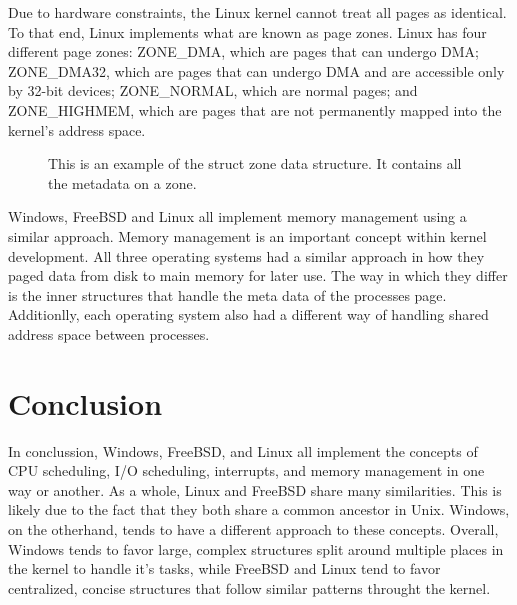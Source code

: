 \documentclass[journal,letterpaper,draftclsnofoot,onecolumn,10pt]{IEEEtran}
\begin{document}
Due to hardware constraints, the Linux kernel cannot treat all pages as identical. To that end, Linux implements what are known as page zones. Linux has four different page zones: ZONE\_DMA, which are pages that can undergo DMA; ZONE\_DMA32, which are pages that can undergo DMA and are accessible only by 32-bit devices; ZONE\_NORMAL, which are normal pages; and ZONE\_HIGHMEM, which are pages that are not permanently mapped into the kernel's address space. \cite{l05}

\begin{figure}[H]
   
   \caption{This is an example of the struct zone data structure. It contains all the metadata on a zone.}
\end{figure}

Windows, FreeBSD and Linux all implement memory management using a similar approach. Memory management is an important concept within kernel development. All three operating systems had a similar approach in how they paged data from disk to main memory for later use. The way in which they differ is the inner structures that handle the meta data of the processes page. Additionlly, each operating system also had a different way of handling shared address space between processes.

\section{Conclusion}

In conclussion, Windows, FreeBSD, and Linux all implement the concepts of CPU scheduling, I/O scheduling, interrupts, and memory management in one way or another. As a whole, Linux and FreeBSD share many similarities. This is likely due to the fact that they both share a common ancestor in Unix. Windows, on the otherhand, tends to have a different approach to these concepts. Overall, Windows tends to favor large, complex structures split around multiple places in the kernel to handle it's tasks, while FreeBSD and Linux tend to favor centralized, concise structures that follow similar patterns throught the kernel.       

\vfill

\pagebreak




\end{document}
